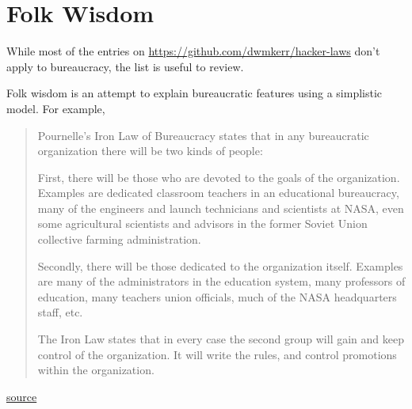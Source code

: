 \section{Folk Wisdom}
While most of the entries on
 \href{https://github.com/dwmkerr/hacker-laws}{https://github.com/dwmkerr/hacker-laws}
don't apply to bureaucracy, the list is useful to review. 


Folk wisdom is an attempt to explain bureaucratic features using a simplistic model. For example,

\begin{quote}
Pournelle's Iron Law of Bureaucracy states that in any bureaucratic organization there will be two kinds of people:

First, there will be those who are devoted to the goals of the organization. Examples are dedicated classroom teachers in an educational bureaucracy, many of the engineers and launch technicians and scientists at NASA, even some agricultural scientists and advisors in the former Soviet Union collective farming administration.

Secondly, there will be those dedicated to the organization itself. Examples are many of the administrators in the education system, many professors of education, many teachers union officials, much of the NASA headquarters staff, etc.

The Iron Law states that in every case the second group will gain and keep control of the organization. It will write the rules, and control promotions within the organization.
\end{quote}
\href{https://www.jerrypournelle.com/reports/jerryp/iron.html}{source}

